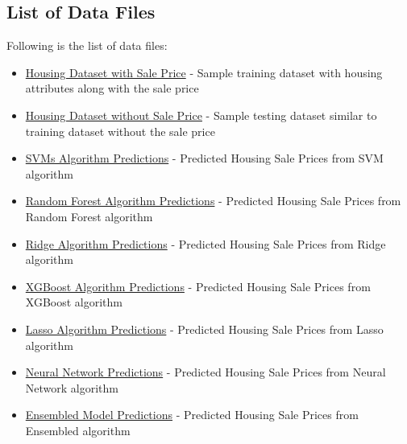 \documentclass[sigconf]{acmart}
\begin{document}
	\subsection{List of Data Files}    
	Following is the list of data files:
	\begin{itemize}        
		\item \href{https://github.com/bigdata-i523/hid306/blob/master/project/data/train.csv}{Housing Dataset with Sale Price} - Sample training dataset with housing attributes along with the sale price
		\item \href{https://github.com/bigdata-i523/hid306/blob/master/project/data/test.csv}{Housing Dataset without Sale Price} - Sample testing dataset similar to training dataset without the sale price
		
		\item \href{https://github.com/bigdata-i523/hid306/blob/master/project/data/kaggle_python_svm.csv}{SVMs Algorithm Predictions} - Predicted Housing Sale Prices from SVM algorithm
		
		\item \href{https://github.com/bigdata-i523/hid306/blob/master/project/data/kaggle_python_random_forest.csv}{Random Forest Algorithm Predictions} - Predicted Housing Sale Prices from Random Forest algorithm
		
		\item \href{https://github.com/bigdata-i523/hid306/blob/master/project/data/kaggle_python_ridge.csv}{Ridge Algorithm Predictions} - Predicted Housing Sale Prices from Ridge algorithm
		
		\item \href{https://github.com/bigdata-i523/hid306/blob/master/project/data/kaggle_python_xgboost.csv}{XGBoost Algorithm Predictions} - Predicted Housing Sale Prices from XGBoost algorithm
		
		\item \href{https://github.com/bigdata-i523/hid306/blob/master/project/data/kaggle_python_lasso.csv}{Lasso Algorithm Predictions} - Predicted Housing Sale Prices from Lasso algorithm
		
		\item \href{https://github.com/bigdata-i523/hid306/blob/master/project/data/kaggle_python_neural_network.csv}{Neural Network Predictions} - Predicted Housing Sale Prices from Neural Network algorithm
		
		\item \href{https://github.com/bigdata-i523/hid306/blob/master/project/data/kaggle_python_ensemble.csv}{Ensembled Model Predictions} - Predicted Housing Sale Prices from Ensembled algorithm    	
	\end{itemize}    
	
\end{document}

